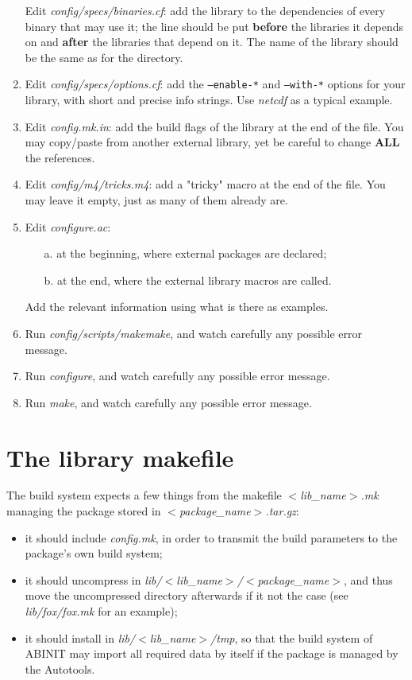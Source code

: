 \begin{enumerate}
 Edit \textit{config/specs/binaries.cf}: add the library to the dependencies
 of every binary that may use it; the line should be put \textbf{before}
 the libraries it depends on and \textbf{after} the libraries that depend
 on it. The name of the library should be the same as for the directory.
 \item
 Edit \textit{config/specs/options.cf}: add the \texttt{--enable-*} and \texttt{--with-*}
 options for your library, with short and precise info strings. Use
 \textit{netcdf} as a typical example.
 \item
 Edit \textit{config.mk.in}: add the build flags of the library at the
 end of the file. You may copy/paste from another external library, yet
 be careful to change \textbf{ALL} the references.
 \item
 Edit \textit{config/m4/tricks.m4}: add a "tricky" macro at the end of
 the file. You may leave it empty, just as many of them already are.
 \item
 Edit \textit{configure.ac}:
 \begin{itemize}
  \item[a. ]
  at the beginning, where external packages are declared;
  \item[b. ]
  at the end, where the external library macros are called.
 \end{itemize}
 Add the relevant information using what is there as examples.
 \item
 Run \textit{config/scripts/makemake}, and watch carefully any possible
 error message.
 \item
 Run \textit{configure}, and watch carefully any possible error message.
 \item
 Run \textit{make}, and watch carefully any possible error message.
\end{enumerate}



\section{The library makefile}

The build system expects a few things from the makefile \textit{$<$lib\_name$>$.mk}
managing the package stored in \textit{$<$package\_name$>$.tar.gz}:
\begin{itemize}
 \item
 it should include \textit{config.mk}, in order to transmit the build
 parameters to the package's own build system;
 \item
 it should uncompress in
 \textit{lib/$<$lib\_name$>$/$<$package\_name$>$}, and thus move
 the uncompressed directory afterwards if it not the case (see
 \textit{lib/fox/fox.mk} for an example);
 \item
 it should install in \textit{lib/$<$lib\_name$>$/tmp}, so that the
 build system of ABINIT may import all required data by itself if the
 package is managed by the Autotools.
\end{itemize}

